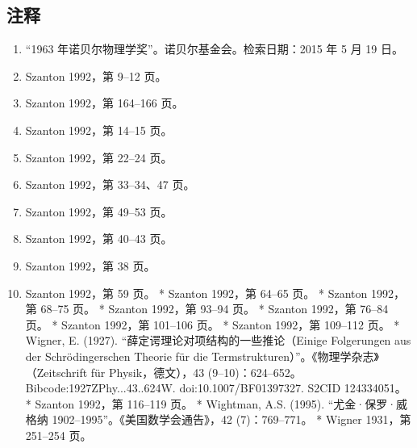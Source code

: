 \subsection{注释}
\begin{enumerate}
\item “1963 年诺贝尔物理学奖”。诺贝尔基金会。检索日期：2015 年 5 月 19 日。
\item Szanton 1992，第 9–12 页。
\item Szanton 1992，第 164–166 页。
\item Szanton 1992，第 14–15 页。
\item Szanton 1992，第 22–24 页。
\item Szanton 1992，第 33–34、47 页。
\item Szanton 1992，第 49–53 页。
\item Szanton 1992，第 40–43 页。
\item Szanton 1992，第 38 页。
\item Szanton 1992，第 59 页。
* Szanton 1992，第 64–65 页。
* Szanton 1992，第 68–75 页。
* Szanton 1992，第 93–94 页。
* Szanton 1992，第 76–84 页。
* Szanton 1992，第 101–106 页。
* Szanton 1992，第 109–112 页。
* Wigner, E. (1927). “薛定谔理论对项结构的一些推论（Einige Folgerungen aus der Schrödingerschen Theorie für die Termstrukturen）”。《物理学杂志》（Zeitschrift für Physik，德文），43 (9–10)：624–652。Bibcode:1927ZPhy...43..624W. doi:10.1007/BF01397327. S2CID 124334051。
* Szanton 1992，第 116–119 页。
* Wightman, A.S. (1995). “尤金·保罗·威格纳 1902–1995”。《美国数学会通告》，42 (7)：769–771。
* Wigner 1931，第 251–254 页。

\end{enumerate}